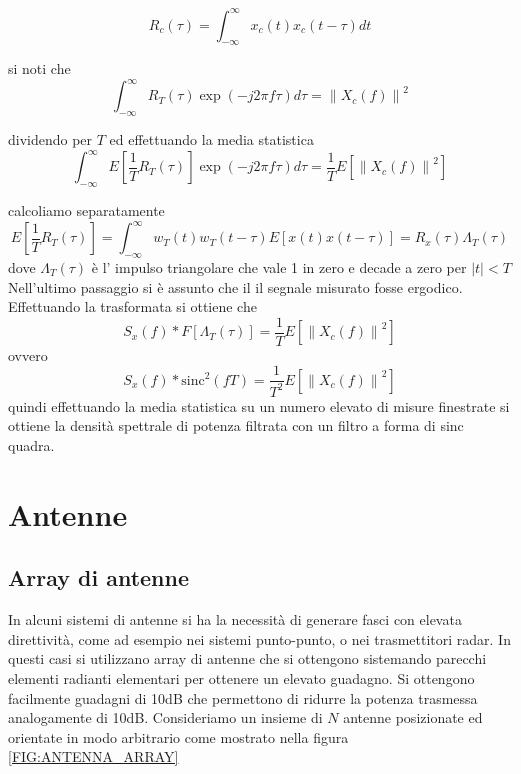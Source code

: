 \documentclass[10pt,a4paper]{book}
\begin{document}
\begin{equation}
R_c(\tau) = \int_{-\infty}^{\infty}  x_c(t)x_c(t- \tau) dt
\end{equation}

si noti che 
\begin{equation}
\int_{-\infty}^{\infty} R_T(\tau) \exp(-j 2 \pi f \tau) d\tau = {\|X_c(f)\|}^2
\end{equation}

dividendo per $T$ ed effettuando la media statistica
\begin{equation}
\int_{-\infty}^{\infty} E\left[ \frac{1}{T} R_T(\tau)\right ] \exp(-j 2 \pi f \tau) d\tau = \frac{1}{T} E \left[ {\|X_c(f)\|}^2 \right]
\end{equation}

calcoliamo separatamente 
\begin{equation}
E\left[ \frac{1}{T} R_T(\tau)\right ] = \int_{-\infty}^{\infty} w_T(t) w_T(t- \tau) E \left[  	x(t)x(t - \tau)\right] = R_x(\tau) \Lambda_{T}(\tau)
\end{equation}
dove $\Lambda_{T} (\tau)$ è l' impulso triangolare che vale 1 in zero e decade a zero per $|t| <T	$
Nell'ultimo passaggio si è assunto che il il segnale misurato fosse ergodico.  
Effettuando la trasformata si ottiene che
\begin{equation}
S_x(f)*F[\Lambda_{T} (\tau)] =  \frac{1}{T} E\left[ {\|X_c(f)\|}^2\right ]
\end{equation}
ovvero 
\begin{equation}
S_x(f)* \mathrm{sinc}^2\left(f T\right) =  \frac{1}{T^2} E\left[ {\|X_c(f)\|}^2\right ]
\end{equation}
quindi effettuando la media statistica su un numero elevato di misure finestrate si ottiene la densità spettrale di potenza filtrata con un filtro a forma di sinc quadra.


\chapter{Antenne}
\section{Array di antenne}
In alcuni sistemi di antenne si ha la necessità di generare fasci con elevata direttività, come ad esempio nei sistemi punto-punto, o nei trasmettitori radar.
In questi casi si utilizzano array di antenne che si ottengono sistemando parecchi elementi radianti elementari per ottenere un elevato guadagno. Si ottengono facilmente guadagni di 10dB che permettono di ridurre la potenza trasmessa analogamente di 10dB. Consideriamo un insieme di $N$ antenne posizionate ed orientate in modo arbitrario come mostrato nella figura \ref{FIG:ANTENNA_ARRAY}
\end{document}
